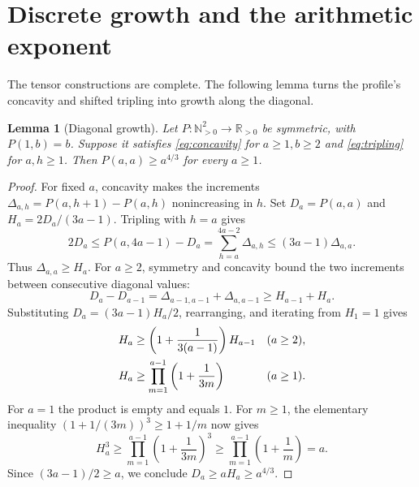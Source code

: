 \documentclass[11pt]{article}
\newtheorem{lemma}[theorem]{Lemma}
\theoremstyle{definition}
\theoremstyle{remark}
\newcommand{\R}{\mathbb R}
\newcommand{\N}{\mathbb N}
\numberwithin{equation}{section}
\begin{document}
\section{Discrete growth and the arithmetic exponent}\label{sec:growth}

The tensor constructions are complete. The following lemma turns the
profile's concavity and shifted tripling into growth along the diagonal.

\begin{lemma}[Diagonal growth]\label{lem:growth}
Let $P:\N_{>0}^2\to\R_{>0}$ be symmetric, with $P(1,b)=b$.
Suppose it satisfies \eqref{eq:concavity} for $a\geq1,b\geq2$ and
\eqref{eq:tripling} for $a,h\geq1$. Then
$P(a,a)\geq a^{4/3}$ for every $a\geq1$.
\end{lemma}

\begin{proof}
For fixed $a$, concavity makes the increments
$\Delta_{a,h}=P(a,h+1)-P(a,h)$ nonincreasing in $h$.
Set $D_a=P(a,a)$ and $H_a=2D_a/(3a-1)$. Tripling with $h=a$ gives
\[
 2D_a\leq P(a,4a-1)-D_a
       =\sum_{h=a}^{4a-2}\Delta_{a,h}
       \leq(3a-1)\Delta_{a,a}.
\]
Thus $\Delta_{a,a}\geq H_a$. For $a\geq2$, symmetry and concavity
bound the two increments between consecutive diagonal values:
\begin{equation}\label{eq:diagonal-rec}
 D_a-D_{a-1}
 =\Delta_{a-1,a-1}+\Delta_{a,a-1}
 \geq H_{a-1}+H_a.
\end{equation}
Substituting $D_a=(3a-1)H_a/2$, rearranging, and iterating from
$H_1=1$ gives
\begin{align}
 H_a&\geq\left(1+\frac1{3(a-1)}\right)H_{a-1}
          &&(a\geq2),\notag\\
 H_a&\geq\prod_{m=1}^{a-1}\left(1+\frac1{3m}\right)
          &&(a\geq1).\label{eq:normalized-growth}
\end{align}
For $a=1$ the product is empty and equals $1$.
For $m\geq1$, the elementary inequality
$(1+1/(3m))^3\geq1+1/m$ now gives
\[
 H_a^3\geq\prod_{m=1}^{a-1}\left(1+\frac1{3m}\right)^3
       \geq\prod_{m=1}^{a-1}\left(1+\frac1m\right)=a.
\]
Since $(3a-1)/2\geq a$, we conclude
$D_a\geq aH_a\geq a^{4/3}$.
\end{proof}
\end{document}
